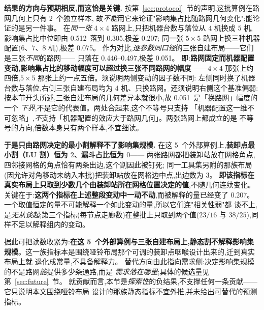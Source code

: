 \documentclass[manuscript,screen,review]{acmart}
\newcommand{\NPubInst}{5}
\newcommand{\NPubNets}{2}
\newcommand{\PubCloLo}{0.305}
\newcommand{\PubCloHi}{0.512}
\newcommand{\PubCloSpread}{0.207}
\newcommand{\PubCloSpreadBig}{0.075}
\newcommand{\SelfCloLo}{0.446}
\newcommand{\SelfCloHi}{0.497}
\newcommand{\SelfCloSpread}{0.051}
\begin{document}
\textbf{结果的方向与预期相反,而这恰是关键.}
按第~\ref{sec:protocol}~节的声明,这批算例在路网几何上只有 \NPubNets\ 个独立样本,
故\emph{不能}用它来论证"影响集占比随路网几何变化";能论证的是另一件事。
在\emph{同一张} \(4\times 4\) 路网上,只把机器台数与落位从 \(4\) 机换成 \(5\) 机,
影响集占比中位即由 \PubCloHi\ 落到 \PubCloLo,极差 \PubCloSpread;
同一张 \(5\times 5\) 路网上换三种机器配置(\(6\)、\(7\)、\(8\) 机),极差 \PubCloSpreadBig。
作为对比,\emph{逐参数同口径}的三张自建布局——它们是三张\emph{不同}的路网——
只落在 \SelfCloLo--\SelfCloHi,极差 \SelfCloSpread。
即:\textbf{路网固定而机器配置变动,影响集占比的移动幅度可以超过换三张不同路网的幅度}
——\(4\times 4\) 那张上约四倍,\(5\times 5\) 那张上约一点五倍。须说明两侧变动的因子数不同:
左侧同时换了机器台数与落位,右侧三张自建布局均为 \(4\) 机、只换路网。还须说明右侧这个基准偏弱:
按本节开头所述,三张自建布局的几何差异本就很小,故 \SelfCloSpread\ 是「换路网」幅度的一个
\emph{下界},不是它的代表值。两处合起来,这个不等号只支持
「机器配置这一维不可忽略」,\emph{不}支持「机器配置的效应大于路网几何」。两张路网上都成立的是
不等号的方向,倍数本身只有两个样本,不宜细读。

\textbf{于是只由路网决定的最小割解释不了影响集规模.}
在这 \NPubInst\ 个外部算例上,\textbf{装卸点最小割（LU 割）恒为 \(2\)、漏斗占比恒为 \(0\)}——
两张路网都把装卸站放在网格角点,四邻接网格的角点恰有两条出边,这个割因此被钉死;
同一工具集另附的那族布局(因允许对角移动未纳入本批)把装卸站放在网格边中点,出边数为 \(3\)。
\textbf{即该指标在真实布局上只取到少数几个由装卸站所在网格位置决定的值},不随几何连续变化。
关键在于:\textbf{这两个指标在上述整段变动中一动不动},而被解释的量已经变了
\PubCloSpread。一个取值恒定的量不可能解释一个如此变动的量,所以它们连"相关性弱"都
谈不上,是\emph{无从谈起};第三个指标(每节点走廊数)在整批上只取到两个值(\(23/16\) 与
\(38/25\)),同样不足以解释组内的变动。

据此可把读数收紧为:\textbf{在这 \NPubInst\ 个外部算例与三张自建布局上,静态割不解释影响集规模}。这一族指标本是围绕哑铃布局那个可调的装卸点咽喉设计出来的,迁到真实布局上就
退化成常量,不具备解释力。
替代方向由此指向需求侧:决定影响集规模的不是路网\emph{能}提供多少条通路,而是
\emph{需求落在哪里};具体的候选量见第~\ref{sec:future}~节。
就贡献而言,本节是\emph{探索性}的负结果,不支撑任何一条贡献——它只说明本文围绕哑铃布局
设计的那族静态指标不宜外推,并未给出可替代的预测指标。
\end{document}
